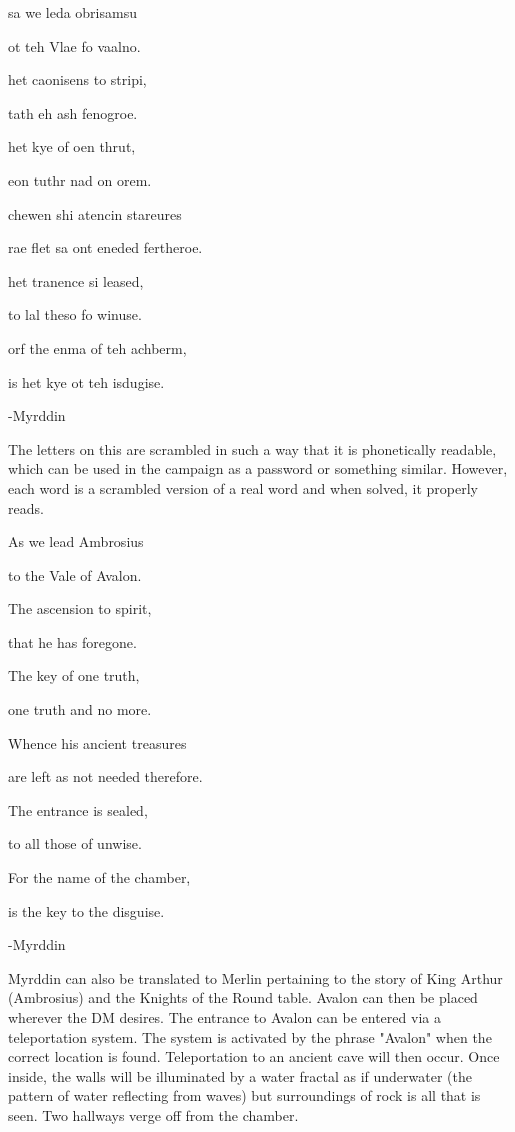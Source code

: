 \begin{center}
	sa we leda obrisamsu  
	
	ot teh Vlae fo vaalno. 
	
	het caonisens to stripi, 
	
	tath eh ash fenogroe. 
	
	het kye of oen thrut, 
	
	eon tuthr nad on orem. 
	
	chewen shi atencin stareures  
	
	rae flet sa ont eneded fertheroe. 
	
	het tranence si leased, 
	
	to lal theso fo winuse. 
	
	orf the enma of teh achberm, 
	
	is het kye ot teh isdugise.
	
	-Myrddin	
\end{center}

The letters on this are scrambled in such a way that it is phonetically readable, which can be used in the campaign as a password or something similar. However, each word is a scrambled version of a real word and when solved, it properly reads.

\begin{center}
	As we lead Ambrosius 
	
	to the Vale of Avalon.
	
	The ascension to spirit,
	
	that he has foregone.
	
	The key of one truth,
	
	one truth and no more.
	
	Whence his ancient treasures 
	
	are left as not needed therefore.
	
	The entrance is sealed,
	
	to all those of unwise.
	
	For the name of the chamber,
	
	is the key to the disguise.
	
	-Myrddin
\end{center}

Myrddin can also be translated to Merlin pertaining to the story of King Arthur (Ambrosius) and the Knights of the Round table. Avalon can then be placed wherever the DM desires. The entrance to Avalon can be entered via a teleportation system. The system is activated by the phrase "Avalon" when the correct location is found. Teleportation to an ancient cave will then occur. Once inside, the walls will be illuminated by a water fractal as if underwater (the pattern of water reflecting from waves) but surroundings of rock is all that is seen. Two hallways verge off from the chamber.

